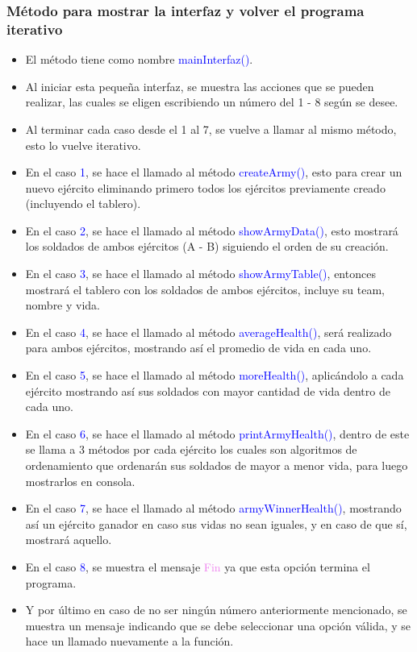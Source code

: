 \documentclass{article}
\begin{document}
        \subsubsection{Método para mostrar la interfaz y volver el programa iterativo}
        \begin{itemize}
            \item El método tiene como nombre \textcolor{blue}{mainInterfaz()}.
            \item Al iniciar esta pequeña interfaz, se muestra las acciones que se pueden realizar, las cuales se eligen escribiendo un número del 1 - 8 según se desee.
            \item Al terminar cada caso desde el 1 al 7, se vuelve a llamar al mismo método, esto lo vuelve iterativo.
            \item En el caso \textcolor{blue}{1}, se hace el llamado al método \textcolor{blue}{createArmy()}, esto para crear un nuevo ejército eliminando primero todos los ejércitos previamente creado (incluyendo el tablero).
            \item En el caso \textcolor{blue}{2}, se hace el llamado al método \textcolor{blue}{showArmyData()}, esto mostrará los soldados de ambos ejércitos (A - B) siguiendo el orden de su creación.
            \item En el caso \textcolor{blue}{3}, se hace el llamado al método \textcolor{blue}{showArmyTable()}, entonces mostrará el tablero con los soldados de ambos ejércitos, incluye su team, nombre y vida.
            \item En el caso \textcolor{blue}{4}, se hace el llamado al método \textcolor{blue}{averageHealth()}, será realizado para ambos ejércitos, mostrando así el promedio de vida en cada uno.
            \item En el caso \textcolor{blue}{5}, se hace el llamado al método \textcolor{blue}{moreHealth()}, aplicándolo a cada ejército mostrando así sus soldados con mayor cantidad de vida dentro de cada uno.
            \item En el caso \textcolor{blue}{6}, se hace el llamado al método \textcolor{blue}{printArmyHealth()}, dentro de este se llama a 3 métodos por cada ejército los cuales son algoritmos de ordenamiento que ordenarán sus soldados de mayor a menor vida, para luego mostrarlos en consola.
            \item En el caso \textcolor{blue}{7}, se hace el llamado al método \textcolor{blue}{armyWinnerHealth()}, mostrando así un ejército ganador en caso sus vidas no sean iguales, y en caso de que sí, mostrará aquello.
            \item En el caso \textcolor{blue}{8}, se muestra el mensaje \textcolor{violet}{Fin} ya que esta opción termina el programa.
            \item Y por último en caso de no ser ningún número anteriormente mencionado, se muestra un mensaje indicando que se debe seleccionar una opción válida, y se hace un llamado nuevamente a la función.
        \end{itemize}
\newpage
        
\end{document}
